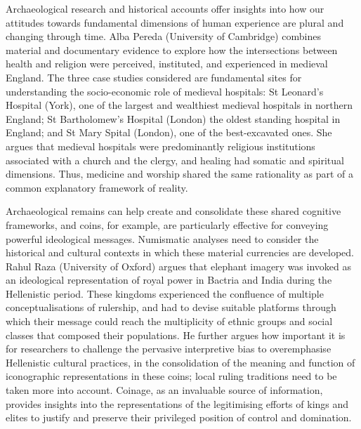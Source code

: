Archaeological research and historical accounts offer insights into how our attitudes towards fundamental dimensions of human experience are plural and changing through time. Alba Pereda (University of Cambridge) combines material and documentary evidence to explore how the intersections between health and religion were perceived, instituted, and experienced in medieval England. The three case studies considered are fundamental sites for understanding the socio-economic role of medieval hospitals: St Leonard’s Hospital (York), one of the largest and wealthiest medieval hospitals in northern England; St Bartholomew’s Hospital (London) the oldest standing hospital in England; and St Mary Spital (London), one of the best-excavated ones. She argues that medieval hospitals were predominantly religious institutions associated with a church and the clergy, and healing had somatic and spiritual dimensions. Thus, medicine and worship shared the same rationality as part of a common explanatory framework of reality.

Archaeological remains can help create and consolidate these shared cognitive frameworks, and coins, for example, are particularly effective for conveying powerful ideological messages. Numismatic analyses need to consider the historical and cultural contexts in which these material currencies are developed. Rahul Raza (University of Oxford) argues that elephant imagery was invoked as an ideological representation of royal power in Bactria and India during the Hellenistic period. These kingdoms experienced the confluence of multiple conceptualisations of rulership, and had to devise suitable platforms through which their message could reach the multiplicity of ethnic groups and social classes that composed their populations. He further argues how important it is for researchers to challenge the pervasive interpretive bias to overemphasise Hellenistic cultural practices, in the consolidation of the meaning and function of iconographic representations in these coins; local ruling traditions need to be taken more into account. Coinage, as an invaluable source of information, provides insights into the representations of the legitimising efforts of kings and elites to justify and preserve their privileged position of control and domination. 

